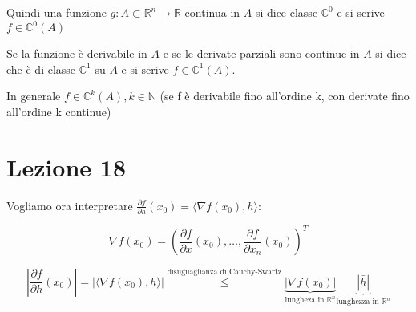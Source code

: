 \documentclass[11pt]{article}
\begin{document}
Quindi una funzione $g: A \subset \mathbb{R}^{n} \rightarrow \mathbb{R}$ continua in $A$ si dice classe $\mathbb{C}^{0}$ e si scrive $f \in \mathbb{C}^{0}(A)$


Se la funzione è derivabile in $A$ e se le derivate parziali sono continue in $A$ si dice che è di classe $\mathbb{C}^{1}$ su $A$ e si scrive $f \in \mathbb{C}^{1}(A)$.


In generale $f \in \mathbb{C}^{k}(A), k \in \mathbb{N}$ (se f è derivabile fino all'ordine k, con derivate fino all'ordine k continue)

\newpage 

\section{Lezione 18}



Vogliamo ora interpretare $\frac{\partial f}{\partial h}(x_0)= \langle \nabla f(x_0), h \rangle$:

\[
    \nabla f(x_0) = (\frac{\partial f}{\partial x}(x_0),\ldots, \frac{\partial f}{\partial x_n}(x_0))^{T}
\]

\[
    |\frac{\partial f}{\partial h}(x_0)| = |\langle \nabla f(x_0),h \rangle | \overset{\text{disuguaglianza di Cauchy-Swartz}}{\le } \underbrace{| \nabla f(x_0)|}_\text{lungheza in $\mathbb{R}^{n}$} \underbrace{|\bar{h} |}_\text{lunghezza in $\mathbb{R}^{n}$}
\]
\end{document}
